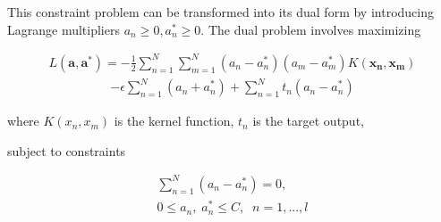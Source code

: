 \documentclass[12pt,notitlepage,twoside]{scrreprt}
\begin{document}
This constraint problem can be transformed into its dual form  by introducing
Lagrange multipliers \(a_n \geq 0, a_n^* \geq 0\).  The dual problem involves
maximizing

\begin{gather} \label{eq:maxim}  L(\mathbf{a},\mathbf{a^*}) =
  -\frac{1}{2}\sum_{n=1}^{N}\sum_{m=1}^{N}(a_n-a_n^*)(a_m-a_m^*)K(\mathbf{x_n},\mathbf{x_m})
\end{gather} \begin{gather*} -\epsilon\sum_{n=1}^{N}(a_n+a_n^*) +
  \sum_{n=1}^{N}t_n(a_n-a_n^*) \end{gather*}

where \(K(x_n,x_m) \) is the kernel function, \(t_n\) is the target output,

subject to constraints

\begin{gather}
  \sum_{n=1}^{N}(a_n-a_n^*)=0,\\
  0\leq a_n,\; a_n^*\leq C,\;\;    n=1,...,l 
\end{gather}
\end{document}
